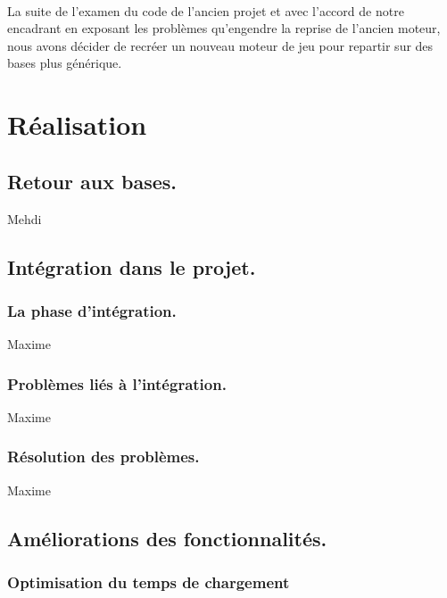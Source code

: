 \documentclass{report}
\begin{document}
\paragraph{} La suite de l'examen du code de l'ancien projet et avec l'accord de notre encadrant en exposant les problèmes qu'engendre la reprise de l'ancien moteur, nous avons décider de recréer un nouveau moteur de jeu pour repartir sur des bases plus générique.


\section{Réalisation}


\subsection{Retour aux bases.} Mehdi
\subsection{Intégration dans le projet.}
\subsubsection{La phase d'intégration.} Maxime
\subsubsection{Problèmes liés à l'intégration.} Maxime
\subsubsection{Résolution des problèmes.} Maxime



\subsection{Améliorations des fonctionnalités.}
\subsubsection{Optimisation du temps de chargement}
\end{document}
